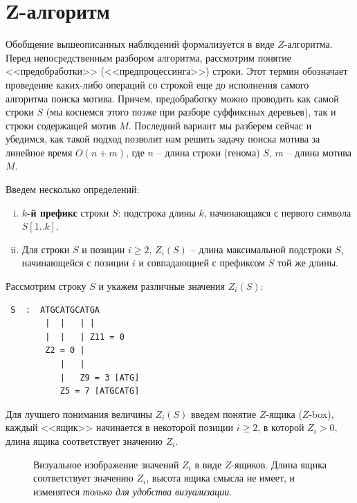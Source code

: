 \documentclass[letterpaper, 11pt]{article}
\begin{document}
\section{Z-алгоритм}
\par
Обобщение вышеописанных наблюдений формализуется в виде $Z$-алгоритма. Перед непосредственным разбором алгоритма, рассмотрим понятие <<предобработки>> (<<предпроцессинга>>) строки. Этот термин обозначает проведение каких-либо операций со строкой еще до исполнения самого алгоритма поиска мотива. Причем, предобработку можно проводить как самой строки $S$ (мы коснемся этого позже при разборе суффиксных деревьев), так и строки содержащей мотив $M$. Последний вариант мы разберем сейчас и убедимся, как такой подход позволит нам решить задачу поиска мотива за линейное время $O(n + m)$, где $n$ -- длина строки (генома) $S$, $m$ -- длина мотива $M$.
\par
Введем несколько определений:
\begin{enumerate}[(i)]
\item
\textbf{$k$-й префикс} строки $S$: подстрока длины $k$, начинающаяся с первого символа $S[1..k]$.
\item
Для строки $S$ и позиции $i \geq 2$, $Z_i(S)$ -- длина максимальной подстроки $S$, начинающейся с позиции $i$ и совпадающией с префиксом $S$ той же длины.
\end{enumerate}
\par
Рассмотрим строку $S$ и укажем различные значения $Z_i(S)$:
\begin{verbatim}
 S  :  ATGCATGCATGA
        |  |   | |
        |  |   | Z11 = 0
        Z2 = 0 |
           |   |
           |   Z9 = 3 [ATG]
           Z5 = 7 [ATGCATG]
\end{verbatim}
\par
Для лучшего понимания величины $Z_i(S)$ введем понятие $Z$-ящика ($Z$-box), каждый <<ящик>> начинается в некоторой позиции $i \geq 2$, в которой $Z_i > 0$, длина ящика соответствует значению $Z_i$.
\begin{figure}[H]
  \caption{Визуальное изображение значений $Z_i$ в виде $Z$-ящиков. Длина ящика соответствует значению $Z_i$, высота ящика смысла не имеет, и изменятеся \textit{только для удобства визуализации}.}
\end{figure}
\end{document}

